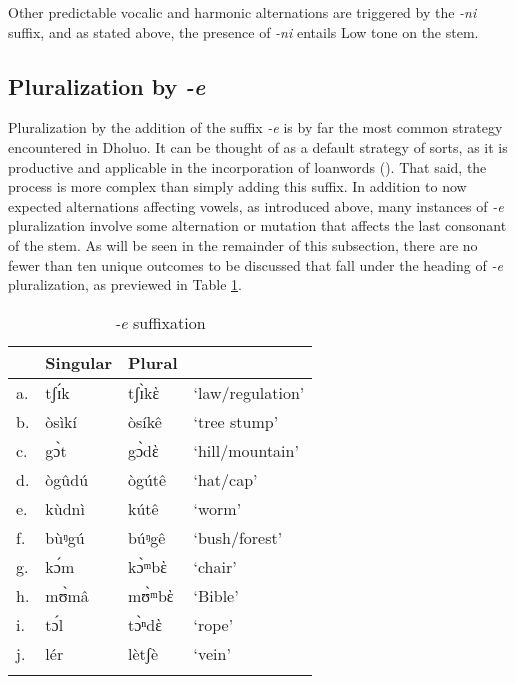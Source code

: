 \documentclass[output=paper,colorlinks,citecolor=brown]{langscibook}
\begin{document}
Other predictable vocalic and harmonic alternations are triggered by the \textit{-ni} suffix, and as stated above, the presence of \textit{-ni} entails Low tone on the stem.

\subsection{Pluralization by \textit{-e}}\largerpage

Pluralization by the addition of the suffix \textit{-e} is by far the most common strategy encountered in Dholuo. It can be thought of as a default strategy of sorts, as it is productive and applicable in the incorporation of loanwords (\cite[91]{Gregersen1961}). That said, the process is more complex than simply adding this suffix. In addition to now expected alternations affecting vowels, as introduced above, many instances of \textit{-e} pluralization involve some alternation or mutation  that affects the last consonant of the stem. As will be seen in the remainder of this subsection, there are no fewer than ten unique outcomes to be discussed that fall under the heading of \textit{-e} pluralization, as previewed in Table  \ref{tab:ESuffixation}. 

\begin{table}
\caption{\textit{-e} suffixation}
\label{tab:ESuffixation}
 \begin{tabular}{llll}
  \lsptoprule
& Singular & Plural &  \\
\midrule
a.&	tʃɪ́k&	tʃɪ̀kὲ&	`law/regulation'\\
b.	&òsìkí	&òsíkê	&`tree stump'\\
c.&	gɔ̀t	&gɔ̀dὲ	&`hill/mountain' \\
d.	&ògûdú&	ògútê	&`hat/cap' \\
e.&	kùdnì&	kútê	&`worm' \\
f.&	bùᵑgú&	búᵑgê&	`bush/forest'\\			
g.&kɔ́m	&kɔ̀ᵐbὲ&	`chair'\\
h.	&mʊ̀mâ&	mʊ̀ᵐbὲ	&`Bible'\\
i.	&tɔ́l	&tɔ̀ⁿdὲ&	`rope'\\
j.&	lér&	lètʃè	&`vein'\\
  \lspbottomrule
 \end{tabular}
\end{table}   
\end{document}
